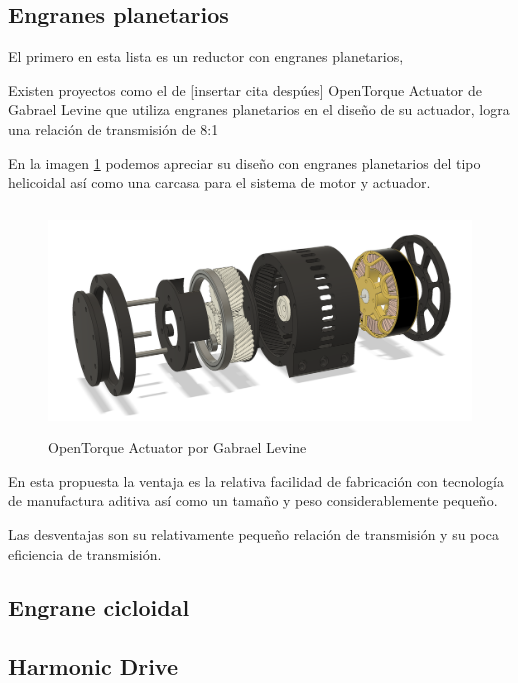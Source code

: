 \subsection{Engranes planetarios}

El primero en esta lista es un reductor con engranes planetarios, 

Existen proyectos como el de [insertar cita despúes] OpenTorque Actuator de Gabrael Levine que utiliza engranes planetarios en el diseño de su actuador, logra una relación de transmisión de 8:1

En la imagen \ref{fig:opentorque} podemos apreciar su diseño con engranes planetarios del tipo  helicoidal así como una carcasa para el sistema de motor y actuador. 

\begin{figure}[h]
    \centering
    \includegraphics[width=15cm, height=6cm, keepaspectratio]{./img/chapter6/opentorque.png}
    \caption{OpenTorque Actuator por Gabrael Levine}
    \label{fig:opentorque}
\end{figure}

En esta propuesta la ventaja es la relativa facilidad de fabricación con tecnología de manufactura aditiva así como un tamaño y peso considerablemente pequeño.

Las desventajas son su relativamente pequeño relación de transmisión y su poca eficiencia de transmisión.

\subsection{Engrane cicloidal}
\subsection{Harmonic Drive}
